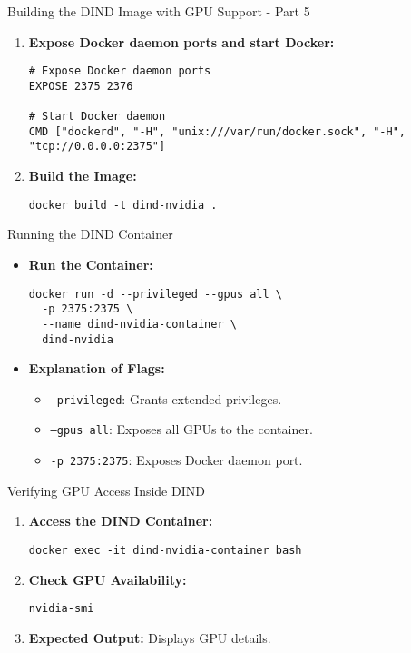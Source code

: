 \documentclass{beamer}
\begin{document}
\begin{frame}[fragile]{Building the DIND Image with GPU Support - Part 5}
    \begin{enumerate}
        \item \textbf{Expose Docker daemon ports and start Docker:}
        \tiny %
        \begin{verbatim}
# Expose Docker daemon ports
EXPOSE 2375 2376

# Start Docker daemon
CMD ["dockerd", "-H", "unix:///var/run/docker.sock", "-H", "tcp://0.0.0.0:2375"]
        \end{verbatim}
        
        \item \textbf{Build the Image:}
        \begin{verbatim}
docker build -t dind-nvidia .
        \end{verbatim}
    \end{enumerate}
\end{frame}


\begin{frame}[fragile]{Running the DIND Container}
    \begin{itemize}
        \item \textbf{Run the Container:}
        \begin{verbatim}
docker run -d --privileged --gpus all \
  -p 2375:2375 \
  --name dind-nvidia-container \
  dind-nvidia
        \end{verbatim}
        \item \textbf{Explanation of Flags:}
        \begin{itemize}
            \item \texttt{--privileged}: Grants extended privileges.
            \item \texttt{--gpus all}: Exposes all GPUs to the container.
            \item \texttt{-p 2375:2375}: Exposes Docker daemon port.
        \end{itemize}
    \end{itemize}
\end{frame}

\begin{frame}[fragile]{Verifying GPU Access Inside DIND}
    \begin{enumerate}
        \item \textbf{Access the DIND Container:}
        \begin{verbatim}
docker exec -it dind-nvidia-container bash
        \end{verbatim}
        \item \textbf{Check GPU Availability:}
        \begin{verbatim}
nvidia-smi
        \end{verbatim}
        \item \textbf{Expected Output:} Displays GPU details.
    \end{enumerate}
\end{frame}
\end{document}
